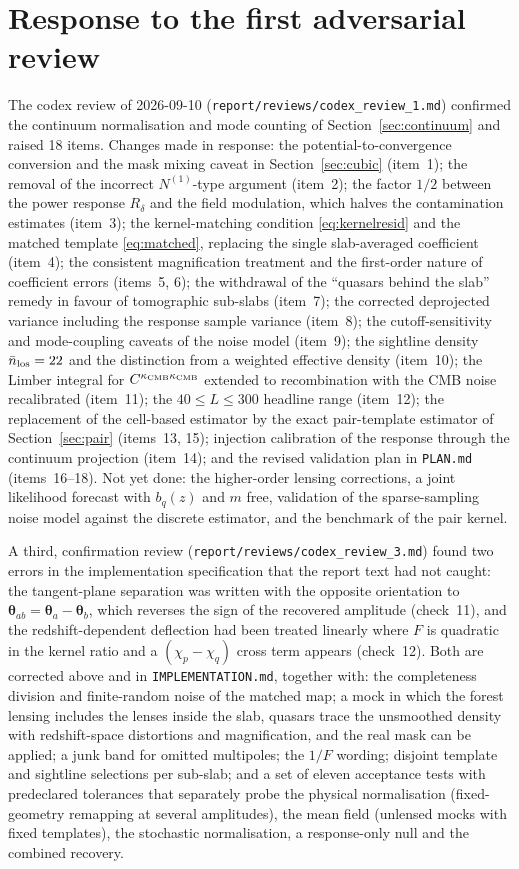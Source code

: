 \documentclass[11pt,a4paper]{article}
\newcommand{\vth}{\bm{\theta}}
\newcommand{\kcmb}{\kappa_{\rm CMB}}
\begin{document}
\section{Response to the first adversarial review}
\label{app:review}
The codex review of 2026-09-10 (\texttt{report/reviews/codex\_review\_1.md}) confirmed the continuum normalisation and mode counting of Section~\ref{sec:continuum} and raised 18 items. Changes made in response: the potential-to-convergence conversion and the mask mixing caveat in Section~\ref{sec:cubic} (item~1); the removal of the incorrect $N^{(1)}$-type argument (item~2); the factor $1/2$ between the power response $R_\delta$ and the field modulation, which halves the contamination estimates (item~3); the kernel-matching condition \eqref{eq:kernelresid} and the matched template \eqref{eq:matched}, replacing the single slab-averaged coefficient (item~4); the consistent magnification treatment and the first-order nature of coefficient errors (items~5, 6); the withdrawal of the ``quasars behind the slab'' remedy in favour of tomographic sub-slabs (item~7); the corrected deprojected variance including the response sample variance (item~8); the cutoff-sensitivity and mode-coupling caveats of the noise model (item~9); the sightline density $\bar n_{\rm los}=22$ and the distinction from a weighted effective density (item~10); the Limber integral for $C^{\kcmb\kcmb}$ extended to recombination with the CMB noise recalibrated (item~11); the $40\le L\le300$ headline range (item~12); the replacement of the cell-based estimator by the exact pair-template estimator of Section~\ref{sec:pair} (items~13, 15); injection calibration of the response through the continuum projection (item~14); and the revised validation plan in \texttt{PLAN.md} (items~16--18). Not yet done: the higher-order lensing corrections, a joint likelihood forecast with $b_q(z)$ and $m$ free, validation of the sparse-sampling noise model against the discrete estimator, and the benchmark of the pair kernel.

A third, confirmation review (\texttt{report/reviews/codex\_review\_3.md}) found two errors in the implementation specification that the report text had not caught: the tangent-plane separation was written with the opposite orientation to $\vth_{ab}=\vth_a-\vth_b$, which reverses the sign of the recovered amplitude (check~11), and the redshift-dependent deflection had been treated linearly where $F$ is quadratic in the kernel ratio and a $(\chi_p-\chi_q)$ cross term appears (check~12). Both are corrected above and in \texttt{IMPLEMENTATION.md}, together with: the completeness division and finite-random noise of the matched map; a mock in which the forest lensing includes the lenses inside the slab, quasars trace the unsmoothed density with redshift-space distortions and magnification, and the real mask can be applied; a junk band for omitted multipoles; the $1/F$ wording; disjoint template and sightline selections per sub-slab; and a set of eleven acceptance tests with predeclared tolerances that separately probe the physical normalisation (fixed-geometry remapping at several amplitudes), the mean field (unlensed mocks with fixed templates), the stochastic normalisation, a response-only null and the combined recovery.
\end{document}
